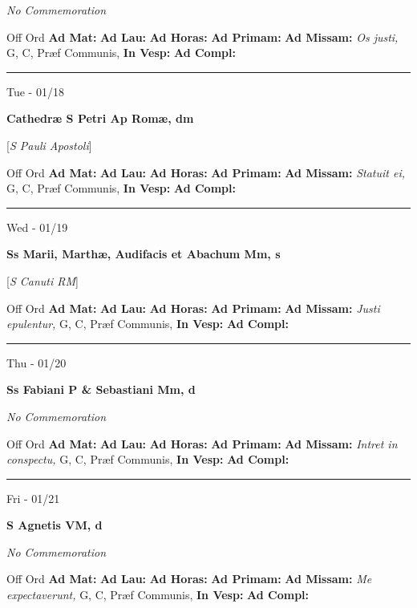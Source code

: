 \documentclass[letterpaper, 10pt]{article}
\begin{document}
\textit{No Commemoration}\begin{justify}
Off Ord
\textbf{Ad Mat: }
\textbf{Ad Lau: }
\textbf{Ad Horas: }
\textbf{Ad Primam: }
\textbf{Ad Missam:} \textit{Os justi, } G, C, Præf Communis, 
\textbf{In Vesp: }
\textbf{Ad Compl: }\end{justify}



\hrule
\begin{center}
Tue - 01/18
\end{center}\textbf{ \large Cathedræ S Petri Ap Romæ, \textnormal{\normalsize dm}}

[\textit{S Pauli Apostoli}]
\begin{justify}
Off Ord
\textbf{Ad Mat: }
\textbf{Ad Lau: }
\textbf{Ad Horas: }
\textbf{Ad Primam: }
\textbf{Ad Missam:} \textit{Statuit ei, } G, C, Præf Communis, 
\textbf{In Vesp: }
\textbf{Ad Compl: }\end{justify}



\hrule
\begin{center}
Wed - 01/19
\end{center}\textbf{ \large Ss Marii, Marthæ, Audifacis et Abachum Mm, \textnormal{\normalsize s}}

[\textit{S Canuti RM}]
\begin{justify}
Off Ord
\textbf{Ad Mat: }
\textbf{Ad Lau: }
\textbf{Ad Horas: }
\textbf{Ad Primam: }
\textbf{Ad Missam:} \textit{Justi epulentur, } G, C, Præf Communis, 
\textbf{In Vesp: }
\textbf{Ad Compl: }\end{justify}



\hrule
\begin{center}
Thu - 01/20
\end{center}\textbf{ \large Ss Fabiani P \& Sebastiani Mm, \textnormal{\normalsize d}}

\textit{No Commemoration}\begin{justify}
Off Ord
\textbf{Ad Mat: }
\textbf{Ad Lau: }
\textbf{Ad Horas: }
\textbf{Ad Primam: }
\textbf{Ad Missam:} \textit{Intret in conspectu, } G, C, Præf Communis, 
\textbf{In Vesp: }
\textbf{Ad Compl: }\end{justify}



\hrule
\begin{center}
Fri - 01/21
\end{center}\textbf{ \large S Agnetis VM, \textnormal{\normalsize d}}

\textit{No Commemoration}\begin{justify}
Off Ord
\textbf{Ad Mat: }
\textbf{Ad Lau: }
\textbf{Ad Horas: }
\textbf{Ad Primam: }
\textbf{Ad Missam:} \textit{Me expectaverunt, } G, C, Præf Communis, 
\textbf{In Vesp: }
\textbf{Ad Compl: }\end{justify}
\end{document}
